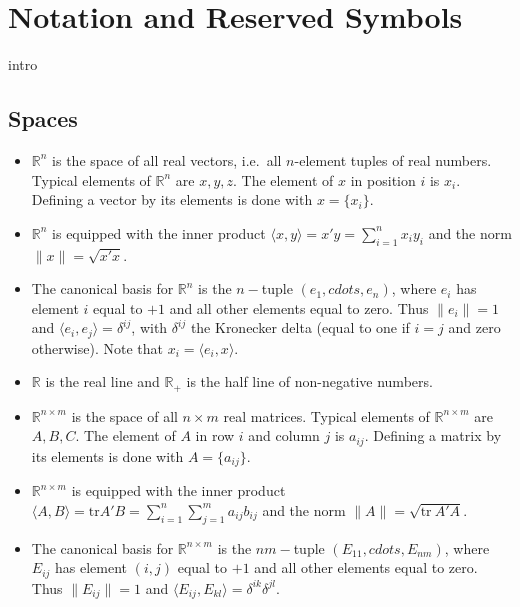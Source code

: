 \documentclass[
  12pt,
]{book}
\begin{document}
\chapter*{Notation and Reserved Symbols}\label{notation-and-reserved-symbols}

intro

\section{Spaces}\label{spaces}

\begin{itemize}
\item
  \(\mathbb{R}^n\) is the space of all real vectors, i.e.~all \(n\)-element tuples of real numbers. Typical elements of \(\mathbb{R}^n\)
  are \(x,y,z\). The element of \(x\) in position
  \(i\) is
  \(x_i\). Defining a vector by its elements is done with \(x=\{x_i\}\).
\item
  \(\mathbb{R}^n\) is equipped with the inner product \(\langle x,y\rangle=x'y=\sum_{i=1}^nx_iy_i\) and the norm \(\|x\|=\sqrt{x'x}\).
\item
  The canonical basis for \(\mathbb{R}^n\) is the \(n-\)tuple \((e_1,cdots,e_n)\), where \(e_i\) has element \(i\) equal to \(+1\)
  and all other elements equal to zero. Thus \(\|e_i\|=1\) and
  \(\langle e_i,e_j\rangle=\delta^{ij}\), with \(\delta^{ij}\) the
  Kronecker delta (equal to one if \(i=j\) and zero otherwise).
  Note that \(x_i=\langle e_i,x\rangle\).
\item
  \(\mathbb{R}\) is the real line and \(\mathbb{R}_+\) is the half line of
  non-negative numbers.
\item
  \(\mathbb{R}^{n\times m}\) is the space of all \(n\times m\) real matrices. Typical elements of \(\mathbb{R}^{n\times m}\) are \(A,B,C\). The element of \(A\) in row \(i\) and column \(j\) is \(a_{ij}\). Defining a matrix by its elements is done with \(A=\{a_{ij}\}\).
\item
  \(\mathbb{R}^{n\times m}\) is equipped with the inner product \(\langle A,B\rangle=\text{tr} A'B=\sum_{i=1}^n\sum_{j=1}^ma_{ij}b_{ij}\) and the norm \(\|A\|=\sqrt{\text{tr}\ A'A}\).
\item
  The canonical basis for \(\mathbb{R}^{n\times m}\) is the \(nm-\)tuple \((E_{11},cdots,E_{nm})\), where \(E_{ij}\) has element \((i,j)\) equal to \(+1\)
  and all other elements equal to zero. Thus \(\|E_{ij}\|=1\) and
  \(\langle E_{ij},E_{kl}\rangle=\delta^{ik}\delta^{jl}\).
\end{itemize}
\end{document}
